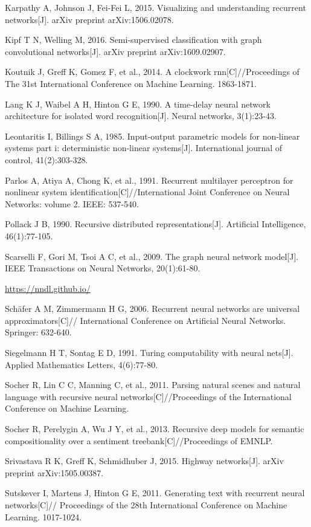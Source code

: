 \documentclass[10pt]{article}
\begin{document}
Karpathy A, Johnson J, Fei-Fei L, 2015. Visualizing and understanding recurrent networks[J]. arXiv preprint arXiv:1506.02078.

Kipf T N, Welling M, 2016. Semi-supervised classification with graph convolutional networks[J]. arXiv preprint arXiv:1609.02907.

Koutnik J, Greff K, Gomez F, et al., 2014. A clockwork rnn[C]//Proceedings of The 31st International Conference on Machine Learning. 1863-1871.

Lang K J, Waibel A H, Hinton G E, 1990. A time-delay neural network architecture for isolated word recognition[J]. Neural networks, 3(1):23-43.

Leontaritis I, Billings S A, 1985. Input-output parametric models for non-linear systems part i: deterministic non-linear systems[J]. International journal of control, 41(2):303-328.

Parlos A, Atiya A, Chong K, et al., 1991. Recurrent multilayer perceptron for nonlinear system identification[C]//International Joint Conference on Neural Networks: volume 2. IEEE: 537-540.

Pollack J B, 1990. Recursive distributed representations[J]. Artificial Intelligence, 46(1):77-105.

Scarselli F, Gori M, Tsoi A C, et al., 2009. The graph neural network model[J]. IEEE Transactions on Neural Networks, 20(1):61-80.

\href{https://nndl.github.io/}{https://nndl.github.io/}

Schäfer A M, Zimmermann H G, 2006. Recurrent neural networks are universal approximators[C]// International Conference on Artificial Neural Networks. Springer: 632-640.

Siegelmann H T, Sontag E D, 1991. Turing computability with neural nets[J]. Applied Mathematics Letters, 4(6):77-80.

Socher R, Lin C C, Manning C, et al., 2011. Parsing natural scenes and natural language with recursive neural networks[C]//Proceedings of the International Conference on Machine Learning.

Socher R, Perelygin A, Wu J Y, et al., 2013. Recursive deep models for semantic compositionality over a sentiment treebank[C]//Proceedings of EMNLP.

Srivastava R K, Greff K, Schmidhuber J, 2015. Highway networks[J]. arXiv preprint arXiv:1505.00387.

Sutskever I, Martens J, Hinton G E, 2011. Generating text with recurrent neural networks[C]// Proceedings of the 28th International Conference on Machine Learning. 1017-1024.
\end{document}
